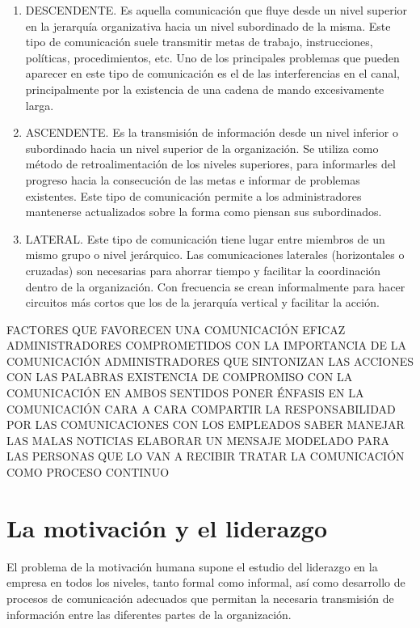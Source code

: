 \documentclass[
]{krantz}
\providecommand{\tightlist}{%
  \setlength{\itemsep}{0pt}\setlength{\parskip}{0pt}}
\begin{document}
\begin{enumerate}
\def\labelenumi{\arabic{enumi}.}
\tightlist
\item
  DESCENDENTE. Es aquella comunicación que fluye desde un nivel superior en la jerarquía organizativa hacia un nivel subordinado de la misma. Este tipo de comunicación suele transmitir metas de trabajo, instrucciones, políticas, procedimientos, etc. Uno de los principales problemas que pueden aparecer en este tipo de comunicación es el de las interferencias en el canal, principalmente por la existencia de una cadena de mando excesivamente larga.
\item
  ASCENDENTE. Es la transmisión de información desde un nivel inferior o subordinado hacia un nivel superior de la organización. Se utiliza como método de retroalimentación de los niveles superiores, para informarles del progreso hacia la consecución de las metas e informar de problemas existentes. Este tipo de comunicación permite a los administradores mantenerse actualizados sobre la forma como piensan sus subordinados.
\item
  LATERAL. Este tipo de comunicación tiene lugar entre miembros de un mismo grupo o nivel jerárquico. Las comunicaciones laterales (horizontales o cruzadas) son necesarias para ahorrar tiempo y facilitar la coordinación dentro de la organización. Con frecuencia se crean informalmente para hacer circuitos más cortos que los de la jerarquía vertical y facilitar la acción.
\end{enumerate}

FACTORES QUE FAVORECEN UNA COMUNICACIÓN EFICAZ
ADMINISTRADORES COMPROMETIDOS CON LA IMPORTANCIA DE LA COMUNICACIÓN
ADMINISTRADORES QUE SINTONIZAN LAS ACCIONES CON LAS PALABRAS
EXISTENCIA DE COMPROMISO CON LA COMUNICACIÓN EN AMBOS SENTIDOS
PONER ÉNFASIS EN LA COMUNICACIÓN CARA A CARA
COMPARTIR LA RESPONSABILIDAD POR LAS COMUNICACIONES CON LOS EMPLEADOS
SABER MANEJAR LAS MALAS NOTICIAS
ELABORAR UN MENSAJE MODELADO PARA LAS PERSONAS QUE LO VAN A RECIBIR
TRATAR LA COMUNICACIÓN COMO PROCESO CONTINUO

\hypertarget{la-motivaciuxf3n-y-el-liderazgo}{%
\section{La motivación y el liderazgo}\label{la-motivaciuxf3n-y-el-liderazgo}}

El problema de la motivación humana supone el estudio del liderazgo en la empresa en todos los niveles, tanto formal como informal, así como desarrollo de procesos de comunicación adecuados que permitan la necesaria transmisión de información entre las diferentes partes de la organización.
\end{document}
